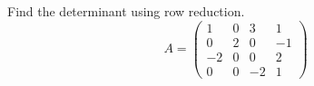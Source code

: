 \documentclass{ximera}
\author{Parisa Fatheddin}
\begin{document}
\begin{exercise}



Find the determinant using row reduction. 
\[
A = \begin{pmatrix}
1 & 0 & 3 & 1\\
0 & 2 & 0 & -1 \\
-2 & 0 & 0 & 2\\
0 & 0 & -2 & 1
\end{pmatrix}
\]














\end{exercise}
\end{document}
